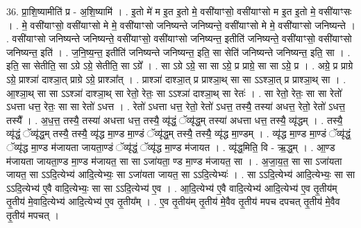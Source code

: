 \documentclass[17pt]{extarticle}
\begin{document}
36. प्रा॒शि॒ष्यामीति॑ प्र - अ॒शि॒ष्यामि॑ । . इ॒तो मे॑ म इ॒त इ॒तो मे॒ वसी॑याꣳसो॒ वसी॑याꣳसो म इ॒त इ॒तो मे॒ वसी॑याꣳसः । . मे॒ वसी॑याꣳसो॒ वसी॑याꣳसो मे मे॒ वसी॑याꣳसो जनिष्यन्ते जनिष्यन्ते॒ वसी॑याꣳसो मे मे॒ वसी॑याꣳसो जनिष्यन्ते । . वसी॑याꣳसो जनिष्यन्ते जनिष्यन्ते॒ वसी॑याꣳसो॒ वसी॑याꣳसो जनिष्यन्त॒ इतीति॑ जनिष्यन्ते॒ वसी॑याꣳसो॒ वसी॑याꣳसो जनिष्यन्त॒ इति॑ । . ज॒नि॒ष्य॒न्त॒ इतीति॑ जनिष्यन्ते जनिष्यन्त॒ इति॒ सा सेति॑ जनिष्यन्ते जनिष्यन्त॒ इति॒ सा । . इति॒ सा सेतीति॒ सा ऽग्रे ऽग्रे॒ सेतीति॒ सा ऽग्रे᳚ । . सा ऽग्रे ऽग्रे॒ सा सा ऽग्रे॒ प्र प्राग्रे॒ सा सा ऽग्रे॒ प्र । . अग्रे॒ प्र प्राग्रे ऽग्रे॒ प्राश्ञा॑ दाश्ञा॒त् प्राग्रे ऽग्रे॒ प्राश्ञा᳚त् । . प्राश्ञा॑ दाश्ञा॒त् प्र प्राश्ञा॒थ् सा सा ऽऽश्ञा॒त् प्र प्राश्ञा॒थ् सा । . आ॒श्ञा॒थ् सा सा ऽऽश्ञा॑ दाश्ञा॒थ् सा रेतो॒ रेतः॒ सा ऽऽश्ञा॑ दाश्ञा॒थ् सा रेतः॑ । . सा रेतो॒ रेतः॒ सा सा रेतो॑ ऽधत्ता धत्त॒ रेतः॒ सा सा रेतो॑ ऽधत्त । . रेतो॑ ऽधत्ता धत्त॒ रेतो॒ रेतो॑ ऽधत्त॒ तस्यै॒ तस्या॑ अधत्त॒ रेतो॒ रेतो॑ ऽधत्त॒ तस्यै᳚ । . अ॒ध॒त्त॒ तस्यै॒ तस्या॑ अधत्ता धत्त॒ तस्यै॒ व्यृ॑द्धं॒ ॅव्यृ॑द्ध॒म् तस्या॑ अधत्ता धत्त॒ तस्यै॒ व्यृ॑द्धम् । . तस्यै॒ व्यृ॑द्धं॒ ॅव्यृ॑द्ध॒म् तस्यै॒ तस्यै॒ व्यृ॑द्ध मा॒ण्ड मा॒ण्डं ॅव्यृ॑द्ध॒म् तस्यै॒ तस्यै॒ व्यृ॑द्ध मा॒ण्डम् । . व्यृ॑द्ध मा॒ण्ड मा॒ण्डं ॅव्यृ॑द्धं॒ ॅव्यृ॑द्ध मा॒ण्ड म॑जायता जायता॒ण्डं ॅव्यृ॑द्धं॒ ॅव्यृ॑द्ध मा॒ण्ड म॑जायत । . व्यृ॑द्ध॒मिति॒ वि - ऋ॒द्ध॒म् । . आ॒ण्ड म॑जायता जायता॒ण्ड मा॒ण्ड म॑जायत॒ सा सा ऽजा॑यता॒ ण्ड मा॒ण्ड म॑जायत॒ सा । . अ॒जा॒य॒त॒ सा सा ऽजा॑यता जायत॒ सा ऽऽदि॒त्येभ्य॑ आदि॒त्येभ्यः॒ सा ऽजा॑यता जायत॒ सा ऽऽदि॒त्येभ्यः॑ । . सा ऽऽदि॒त्येभ्य॑ आदि॒त्येभ्यः॒ सा सा ऽऽदि॒त्येभ्य॑ ए॒वै वादि॒त्येभ्यः॒ सा सा ऽऽदि॒त्येभ्य॑ ए॒व । . आ॒दि॒त्येभ्य॑ ए॒वै वादि॒त्येभ्य॑ आदि॒त्येभ्य॑ ए॒व तृ॒तीय॑म् तृ॒तीय॑ मे॒वादि॒त्येभ्य॑ आदि॒त्येभ्य॑ ए॒व तृ॒तीय᳚म् । . ए॒व तृ॒तीय॑म् तृ॒तीय॑ मे॒वैव तृ॒तीय॑ मपच दपचत् तृ॒तीय॑ मे॒वैव तृ॒तीय॑ मपचत् । \newline
\pagebreak
{}
\end{document}

